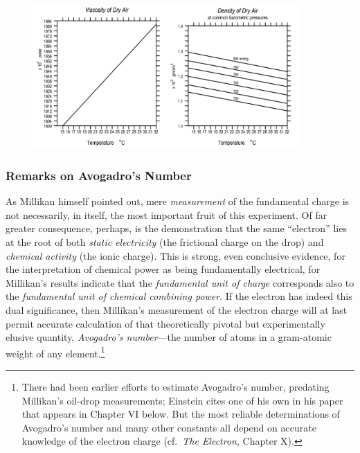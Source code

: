 \begin{figure}[h]
  \begin{center}
    \includegraphics[width=0.9\textwidth]{images/03_millikan/image100.png}
  \end{center}
\end{figure}



\subsubsection*{Remarks on Avogadro's Number}

As Millikan himself pointed out, mere \emph{measurement} of the
fundamental charge is not necessarily, in itself, the most important
fruit of this experiment. Of far greater con\-se\-quence, perhaps, is the
demonstration that the same ``electron'' lies at the root of both
\emph{static electricity} (the frictional charge on the drop) and
\emph{chemical activity} (the ionic charge). This is strong, even
conclusive evidence, for the interpretation of chemical power as being
fundamentally electrical, for Millikan's results indicate that the
\emph{fundamental unit of charge} corresponds also to the
\emph{fundamental unit of chemical combining power}. If the electron has
indeed this dual significance, then Millikan's measurement of the
electron charge will at last permit accurate calculation of that
theoretically pivotal but ex\-per\-i\-men\-tal\-ly elusive quantity,
\emph{Avogadro's number}---the number of atoms in a gram-atomic weight
of any element.\footnote{There had been earlier efforts to estimate
  Avogadro's number, predating Millikan's oil-drop measurements;
  Einstein cites one of his own in his paper that appears in Chapter VI
  below. But the most reliable determinations of Avogadro's number and
  many other constants all depend on accurate knowledge of the electron
  charge (cf.\ \emph{The Electron}, Chapter X).}


